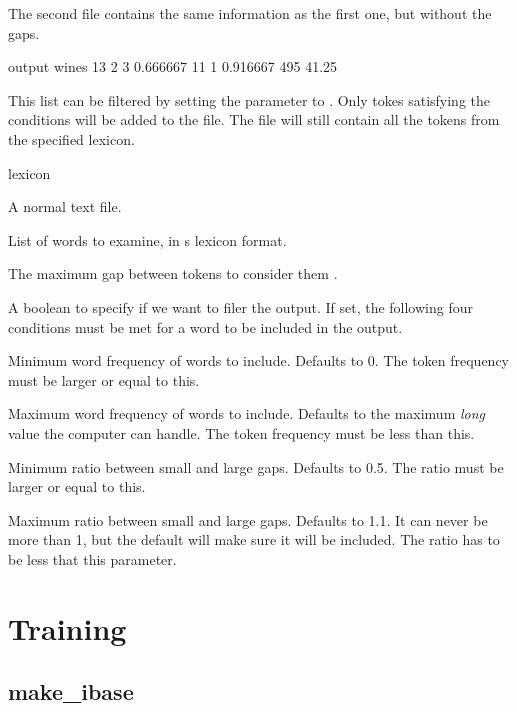 \documentclass[a4paper,10pt,twoside]{report}
\begin{document}
The second file contains the same information as the first one, but
without the gaps.

\begin{wout}{ output}
wines 13 2 3 0.666667 11 1 0.916667 495 41.25
\end{wout}

This list can be filtered by setting the  parameter to
. Only tokes satisfying the conditions will be added to the
 file. The  file will still contain all the tokens
from the specified lexicon.

\begin{varlist}{lexicon}
\item[filename] A normal text file.
\item[lexicon] List of words to examine, in \wopr{}s lexicon format.
\item[gap] The maximum gap between tokens to consider them
  .
\item[filter] A boolean to specify if we want to filer the 
  output. If set, the following four conditions must be met for a word
  to be included in the output.
\item[min\_f] Minimum word frequency of words to include. Defaults to
  0. The token frequency must be larger or equal to this.
\item[max\_f] Maximum word frequency of words to include. Defaults to
  the maximum \emph{long} value the computer can handle. The token
  frequency must be less than this.
\item[min\_r] Minimum ratio between small and large gaps. Defaults to
  0.5. The ratio must be larger or equal to this.
\item[max\_r] Maximum ratio between small and large gaps. Defaults to
  1.1. It can never be more than 1, but the default will make sure it
  will be included. The ratio has to be less that this parameter.
\end{varlist}


\section{Training}

\subsection{make\_ibase}
\end{document}

